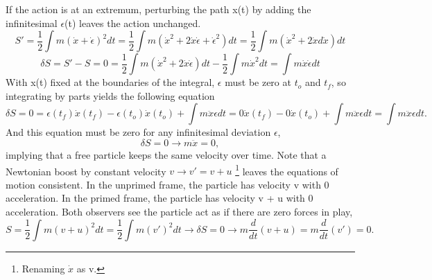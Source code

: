 If the action is at an extremum, perturbing the path x(t) by adding the infinitesimal $\epsilon$(t) leaves the action unchanged.
\begin{equation}
S' = \frac{1}{2} \int m(\dot{x} + \dot{\epsilon})^2 dt = \frac{1}{2} \int m(\dot{x}^2 + 2\dot{x}\dot{\epsilon} + \dot{\epsilon}^2) dt =  
\frac{1}{2} \int m(\dot{x}^2 + 2\dot{x}d\dot{x}) dt 
\end{equation}
\begin{equation}
\delta S = S' - S = 0 = \frac{1}{2} \int m(\dot{x}^2 + 2\dot{x}\dot{\epsilon}) dt - \frac{1}{2} \int m\dot{x}^2 dt = \int m\dot{x}\dot{\epsilon} dt
\end{equation}
With x(t) fixed at the boundaries of the integral, $\epsilon$ must be zero at $t_o$ and $t_f$, so integrating by parts yields the following equation 
\begin{equation}
\delta S = 0 = \epsilon(t_f) \dot{x}(t_f)  - \epsilon(t_o) \dot{x}(t_o) + \int m\ddot{x} \epsilon dt  = 
0\dot{x}(t_f)  - 0\dot{x}(t_o) + \int m\ddot{x} \epsilon dt = \int m\ddot{x} \epsilon dt.
\end{equation}
And this equation must be zero for any infinitesimal deviation $\epsilon$,
\begin{equation}
\delta S = 0 \rightarrow m\ddot{x} = 0,
\end{equation}
implying that a free particle keeps the same velocity over time. Note that a Newtonian boost by constant velocity $v \rightarrow v' = v + u$ \footnote{Renaming $\dot{x}$ as v.} leaves the equations of motion consistent. In the unprimed frame, the particle has velocity v with 0 acceleration. In the primed frame, the particle has velocity v + u with 0 acceleration. Both observers see the particle act as if there are zero forces in play,
\begin{equation}
S = \frac{1}{2} \int m(v + u)^2 dt  =  \frac{1}{2} \int m(v')^2 dt \rightarrow \delta S = 0 \rightarrow m\frac{d}{dt}(v+u) = m\frac{d}{dt}(v') = 0.
\end{equation}

